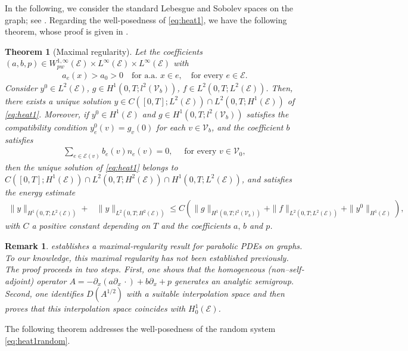 \documentclass[10pt,a4paper]{amsart}
\newtheorem{theorem}{Theorem}[section]
\newtheorem{remark}{Remark}[section]
\begin{document}
In the following, we consider the standard Lebesgue and Sobolev spaces on the graph; see .
Regarding the well-posedness of \eqref{eq:heat1}, we have the following theorem, whose proof is given in . 
\begin{theorem}[Maximal regularity]\label{th:well_posedness_nonhomo}
    Let the coefficients $(a,b,p)\in W^{1,\infty}_{pw}(\mathcal{E})\times L^\infty(\mathcal{E})\times L^\infty(\mathcal{E})$ with 
    \begin{align}\label{eq:assumption_coef_a}
        a_e(x)>a_0>0 \quad \text{for a.a.  } x\in e,\quad \text{for every } e\in\mathcal{E}.
    \end{align}
    Consider $y^0 \in L^2(\mathcal{E})$, $g \in H^1(0, T; l^2(\mathcal{V}_b))$, $f \in L^2(0, T; L^2(\mathcal{E}))$. Then, there exists a unique solution $y \in C([0, T]; L^2(\mathcal{E})) \cap L^2(0, T; H^1(\mathcal{E}))$ of \eqref{eq:heat1}. Moreover, if $y^0 \in H^1(\mathcal{E})$ and $g \in H^1(0, T; l^2(\mathcal{V}_b))$ satisfies the compatibility condition $y_e^0(v) = g_v(0)$ for each $v \in \mathcal{V}_b$, and the coefficient $b$ satisfies   
    \begin{align}\label{eq:assumption_coef_b}
        \sum_{e\in \mathcal{E}(v)}b_e(v)n_e(v) = 0, \quad\text{ for every }v\in \mathcal{V}_0,
    \end{align}
    then the unique solution of \eqref{eq:heat1} belongs to $C([0, T]; H^1(\mathcal{E}))\cap L^2(0,T; H^2(\mathcal{E}))\cap H^1(0,T; L^2(\mathcal{E}))$, and satisfies the energy estimate \begin{align}\label{eq:energy_estimation_y_wellposedness}
    \|y\|_{H^1(0,T;L^2(\mathcal{E}))} +&\|y\|_{L^2(0,T;H^2(\mathcal{E}))} \leq C \left( \|g\|_{H^1(0, T;l^2(\mathcal{V}_b))}+\|f\|_{L^2(0, T;L^2(\mathcal{E}))} + \|y^0\|_{H^1(\mathcal{E})} \right),
    \end{align}
    with $C$ a positive constant depending on $T$ and the coefficients $a,\,b$ and $p$.
\end{theorem}
\begin{remark}
     establishes a maximal‐regularity result for parabolic PDEs on graphs. To our knowledge, this maximal regularity has not been established previously. The proof proceeds in two steps. First, one shows that the homogeneous (non–self‐adjoint) operator $A=-\partial_x(a\partial_x\,\cdot)+b\partial_x+p$ generates an analytic semigroup. Second, one identifies $D(A^{1/2})$ with a suitable interpolation space and then proves that this interpolation space coincides with $H_0^1(\mathcal{E})$.
\end{remark}
The following theorem addresses the well-posedness of the random system \eqref{eq:heat1random}.
\end{document}
